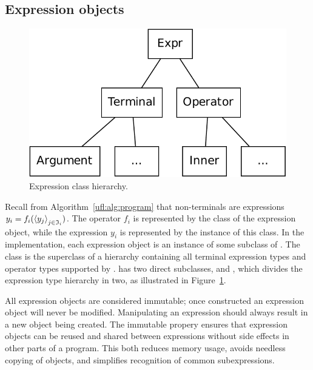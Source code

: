\subsection{Expression objects}

\begin{figure}[tb]
\centering
\includegraphics[width=\largefig]{chapters/alnes-1/pdf/expr.pdf}
\caption{Expression class hierarchy.}
\label{ufl:fig:expr}
\end{figure}

Recall from Algorithm~\ref{ufl:alg:program} that non-terminals are
expressions $y_i = f_i(\left<y_j\right>_{j\in\mathfrak{I}_i})$.  The operator
$f_i$ is represented by the class of the expression object, while the
expression $y_i$ is represented by the instance of this class.  In the
\ufl{} implementation, each expression object is an instance of some
subclass of . The class  is the superclass of
a hierarchy containing all terminal expression types and operator
types supported by \ufl{}.  has two direct subclasses,
 and , which divides the expression
type hierarchy in two, as illustrated in Figure~\ref{ufl:fig:expr}.

All expression objects are considered immutable; once constructed an
expression object will never be modified.  Manipulating an expression
should always result in a new object being created.  The immutable
propery ensures that expression objects can be reused and shared
between expressions without side effects in other parts of a program.
This both reduces memory usage, avoids needless copying of objects,
and simplifies recognition of common subexpressions.

